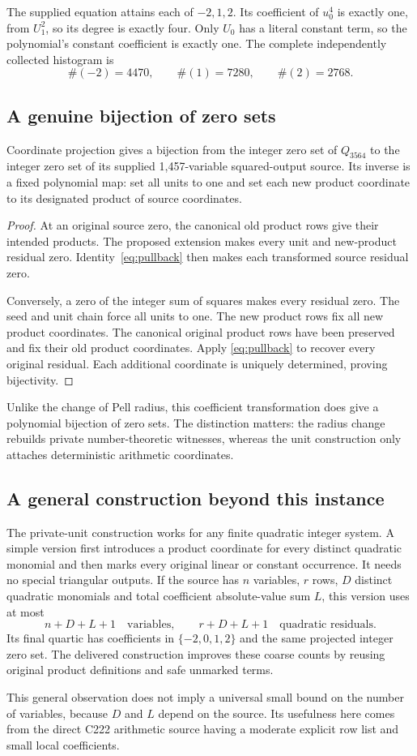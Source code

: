 The supplied equation attains each of \(-2,1,2\). Its coefficient of \(u_0^4\) is exactly one, from \(U_1^2\), so its degree is exactly four. Only \(U_0\) has a literal constant term, so the polynomial's constant coefficient is exactly one. The complete independently collected histogram is
\[
\#(-2)=4470,\qquad\#(1)=7280,\qquad\#(2)=2768.
\]

\subsection{A genuine bijection of zero sets}

\begin{theorem}\label{thm:unitbijection}
Coordinate projection gives a bijection from the integer zero set of \(Q_{3564}\) to the integer zero set of its supplied 1,457-variable squared-output source. Its inverse is a fixed polynomial map: set all units to one and set each new product coordinate to its designated product of source coordinates.
\end{theorem}
\begin{proof}
At an original source zero, the canonical old product rows give their intended products. The proposed extension makes every unit and new-product residual zero. Identity~\eqref{eq:pullback} then makes each transformed source residual zero.

Conversely, a zero of the integer sum of squares makes every residual zero. The seed and unit chain force all units to one. The new product rows fix all new product coordinates. The canonical original product rows have been preserved and fix their old product coordinates. Apply \eqref{eq:pullback} to recover every original residual. Each additional coordinate is uniquely determined, proving bijectivity.
\end{proof}

Unlike the change of Pell radius, this coefficient transformation does give a polynomial bijection of zero sets. The distinction matters: the radius change rebuilds private number-theoretic witnesses, whereas the unit construction only attaches deterministic arithmetic coordinates.

\subsection{A general construction beyond this instance}

The private-unit construction works for any finite quadratic integer system. A simple version first introduces a product coordinate for every distinct quadratic monomial and then marks every original linear or constant occurrence. It needs no special triangular outputs. If the source has \(n\) variables, \(r\) rows, \(D\) distinct quadratic monomials and total coefficient absolute-value sum \(L\), this version uses at most
\[
n+D+L+1\quad\text{variables},\qquad
r+D+L+1\quad\text{quadratic residuals}.
\]
Its final quartic has coefficients in \(\{-2,0,1,2\}\) and the same projected integer zero set. The delivered construction improves these coarse counts by reusing original product definitions and safe unmarked terms.

This general observation does not imply a universal small bound on the number of variables, because \(D\) and \(L\) depend on the source. Its usefulness here comes from the direct C222 arithmetic source having a moderate explicit row list and small local coefficients.
